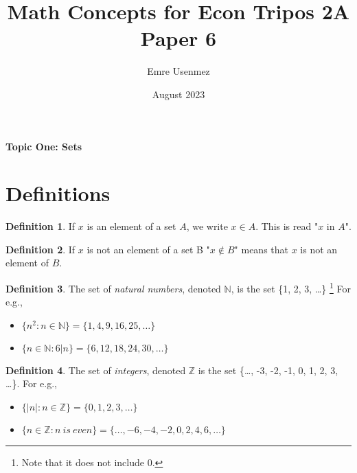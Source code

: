 \documentclass{amsart} %
\title{Math Concepts for Econ Tripos 2A Paper 6}
\author{Emre Usenmez}
\date{August 2023}
\theoremstyle{definition} %
\newtheorem*{dfn}{Definition} %
\theoremstyle{proposition} %
\theoremstyle{remark} %
\begin{document}


\begin{center}
      \textbf{Topic One: Sets}
\end{center}



\section{\textbf{Definitions}}


\begin{dfn}
\boxed{\in} \quad If $x$ is an element of a set $A$, we write $x \in A$. This is read "$x$ in $A$". %
\end{dfn}

\begin{dfn}
\boxed{\not\in} \quad If $x$ is not an element of a set B "$x \not\in B$" means that $x$ is not an element of $B$.
\end{dfn}

\begin{dfn}
 \quad The set of \emph{natural numbers}, denoted $\mathbb{N}$, is the set \{1, 2, 3, \dots\} \footnote{Note that it does not include 0.} For e.g.,
    \begin{itemize}
          \item $\{n^2:n \in \mathbb{N} \} = \{1, 4, 9, 16, 25, \dots\}$
          \item $\{n \in \mathbb{N} : 6|n\} = \{6, 12, 18, 24, 30, \dots\}$
    \end{itemize}
\end{dfn}

\begin{dfn}
 \quad The set of \emph{integers}, denoted $\mathbb{Z}$ is the set \{\dots, -3, -2, -1, 0, 1, 2, 3, \dots \}. For e.g.,
    \begin{itemize}
          \item $\{|n|:n \in \mathbb{Z} \} = \{0, 1, 2, 3, \dots\}$
          \item $\{n \in \mathbb{Z}: n\ is\ even\} = \{\dots, -6, -4, -2, 0, 2, 4, 6, \dots \}$ %
    \end{itemize}
\end{dfn}
\end{document}

